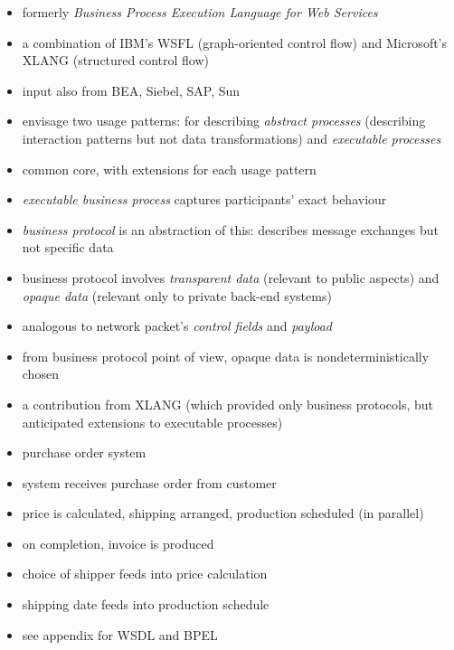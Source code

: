 \documentclass{sepslide-soa-faked} %
\begin{document}
\begin{slide}
\begin{itemize}
\item formerly \emph{Business Process Execution Language for Web Services}
\item a combination of IBM's WSFL (graph-oriented control flow) and
  Microsoft's XLANG (structured control flow)
\item input also from BEA, Siebel, SAP, Sun
\item envisage two usage patterns: for describing \emph{abstract processes}
  (describing interaction patterns but not data transformations) and
  \emph{executable processes} 
\item common core, with extensions for each usage pattern
\end{itemize}
\end{slide}

\begin{slide}
\begin{itemize}
\item \emph{executable business process} captures participants' exact
behaviour
\item \emph{business protocol} is an abstraction of this: describes message
exchanges but not specific data
\item business protocol involves \emph{transparent data} (relevant to
public aspects) and \emph{opaque data} (relevant only to private back-end
systems)
\item analogous to network packet's \emph{control fields} and
\emph{payload}
\item from business protocol point of view, opaque data is
nondeterministically chosen
\item a contribution from XLANG (which provided only business protocols,
  but anticipated extensions to executable processes)
\end{itemize}
\end{slide}

\begin{slide}
\begin{itemize}
\item purchase order system
\item system receives purchase order from customer
\item price is calculated, shipping arranged, production scheduled
  (in parallel)
\item on completion, invoice is produced
\item choice of shipper feeds into price calculation
\item shipping date feeds into production schedule
\medskip
\item see appendix for WSDL and BPEL
\end{itemize}
\end{slide}
\end{document}
